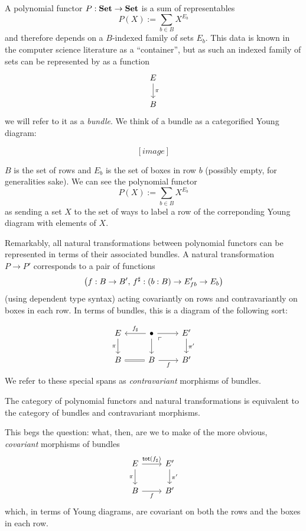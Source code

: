 
A polynomial functor $P : \operatorname{\textbf{Set}} \to \operatorname{\textbf{Set}}$ is a sum of representables
$$P(X) := \sum_{b \in B} X^{E_b}$$
and therefore depends on a $B$-indexed family of sets $E_b$. This data is known
in the computer science literature as a ``container'', but as such an indexed
family of sets can be represented by as a function
\[
  \begin{tikzcd}
    E \arrow[d, "\pi"] \\
    B
  \end{tikzcd}
\]
we will refer to it as a \emph{bundle}. We think of a bundle as a categorified
Young diagram:

\[
[image]
\]

$B$ is the set of rows and $E_b$ is the set of boxes in row $b$ (possibly empty,
for generalities sake). We can see the polynomial functor
$$P(X) := \sum_{b \in B} X^{E_b}$$
as sending a set $X$ to the set of ways to label a row of the correponding Young
diagram with elements of $X$.

Remarkably, all natural transformations between polynomial functors can be
represented in terms of their associated bundles. A natural transformation $P
\to P'$ corresponds to a pair of functions
\[
\left( f : B \to B',\, f^{\sharp} : ({b : B}) \to E'_{fb} \to E_b \right)
\]
(using dependent type syntax) acting covariantly on rows and contravariantly on
boxes in each row. In terms of bundles, this is a diagram of the following sort:

\[
  \begin{tikzcd}
    E \arrow[d, "\pi"'] \arrow[r, leftarrow, "f_{\sharp}"] & \bullet \arrow[d] \arrow[r]
    \arrow[dr, phantom, "\ulcorner" very near start] & E' \arrow[d, "\pi'"] \\
    B \arrow[r, equals] & B \arrow[r, "f"'] & B'
  \end{tikzcd}
\]
We refer to these special spans as \emph{contravariant} morphisms of bundles.

\begin{thm}[cite]
The category of polynomial functors and natural transformations is equivalent to
the category of bundles and contravariant morphisms.
\end{thm}

This begs the question: what, then, are we to make of the more obvious,
\emph{covariant} morphisms of bundles
\[
  \begin{tikzcd}
E \arrow[r, "\term{tot}(f_{\sharp})"] \arrow[d, "\pi"'] & E' \arrow[d, "\pi'"] \\
B \arrow[r, "f"']                                       & B'                  
\end{tikzcd}
\]
which, in terms of Young diagrams, are covariant on both the rows and the boxes
in each row.


